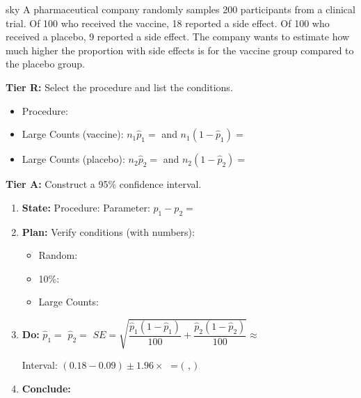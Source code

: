 \documentclass[10pt]{article}
\begin{document}
\begin{scenariobox}{sky}
A pharmaceutical company randomly samples 200 participants from a clinical trial.
Of 100 who received the vaccine, 18 reported a side effect. Of 100 who received a
placebo, 9 reported a side effect. The company wants to estimate how much higher the
proportion with side effects is for the vaccine group compared to the placebo group.

\textbf{Tier R:} Select the procedure and list the conditions.
\begin{itemize}
  \item Procedure: \blank{8cm}
  \item Large Counts (vaccine): $n_1 \hat p_1 =$ \blank{2.5cm} and $n_1(1-\hat p_1) =$ \blank{2.5cm}
  \item Large Counts (placebo): $n_2 \hat p_2 =$ \blank{2.5cm} and $n_2(1-\hat p_2) =$ \blank{2.5cm}
\end{itemize}

\textbf{Tier A:} Construct a 95\% confidence interval.
\begin{enumerate}
  \item \textbf{State:} Procedure: \blank{7cm} \quad
        Parameter: $p_1 - p_2 =$ \blank{6cm}
  \item \textbf{Plan:} Verify conditions (with numbers):
        \begin{itemize}
          \item Random: \writeline
          \item 10\%: \writeline
          \item Large Counts: \writeline
        \end{itemize}
  \item \textbf{Do:} $\hat p_1 =$ \blank{1.5cm} \; $\hat p_2 =$ \blank{1.5cm} \;
        $SE = \sqrt{\dfrac{\hat p_1(1-\hat p_1)}{100} + \dfrac{\hat p_2(1-\hat p_2)}{100}} \approx$ \blank{1.8cm}

        Interval: $(0.18-0.09) \pm 1.96 \times$ \blank{1.8cm} $= ($ \blank{1.5cm}, \blank{1.5cm} $)$
  \item \textbf{Conclude:} \writeline
\end{enumerate}
\end{scenariobox}
\end{document}
